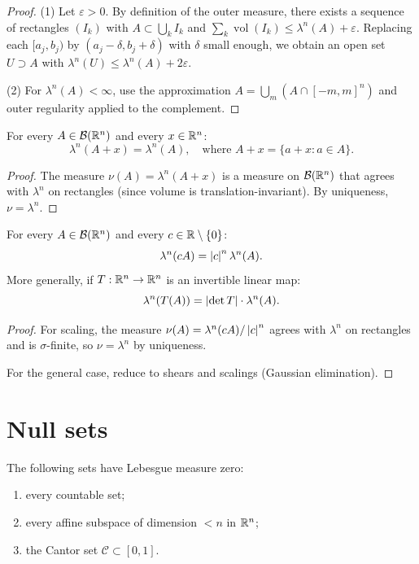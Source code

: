 \begin{proof}
(1) Let $\varepsilon > 0$. By definition of the outer measure, there exists a
sequence of rectangles $(I_k)$ with $A \subset \bigcup_k I_k$ and
$\sum_k \operatorname{vol}(I_k) \leq \lambda^n(A) + \varepsilon$. Replacing each
$[a_j, b_j)$ by $(a_j - \delta, b_j + \delta)$ with $\delta$ small enough, we
obtain an open set $U \supset A$ with $\lambda^n(U) \leq \lambda^n(A) +
2\varepsilon$.

(2) For $\lambda^n(A) < \infty$, use the approximation
$A = \bigcup_m (A \cap [-m, m]^n)$ and outer regularity applied to the complement.
\end{proof}

\begin{theorem}
\label{thm:translation_invariance}
For every $A \in \mathcal{B}(\mathbb{R}^n)$ and every $x \in \mathbb{R}^n$:
\[
\lambda^n(A + x) = \lambda^n(A), \quad \text{where } A + x = \{a + x : a \in A\}.
\]
\end{theorem}

\begin{proof}
The measure $\nu(A) = \lambda^n(A + x)$ is a measure on $\mathcal{B}(\mathbb{R}^n)$ that
agrees with $\lambda^n$ on rectangles (since volume is translation-invariant). By
uniqueness, $\nu = \lambda^n$.
\end{proof}

\begin{theorem}
For every $A \in \mathcal{B}(\mathbb{R}^n)$ and every $c \in \mathbb{R} \setminus \{0\}$:
\[
\lambda^n(cA) = \left| c \right|^n \lambda^n(A).
\]
More generally, if $T : \mathbb{R}^n \to \mathbb{R}^n$ is an invertible linear map:
\[
\lambda^n(T(A)) = \left| \det T \right| \cdot \lambda^n(A).
\]
\end{theorem}

\begin{proof}
For scaling, the measure $\nu(A) = \lambda^n(cA)/\left| c \right|^n$ agrees with $\lambda^n$
on rectangles and is $\sigma$-finite, so $\nu = \lambda^n$ by uniqueness.

For the general case, reduce to shears and scalings (Gaussian elimination).
\end{proof}

\section{Null sets}

\begin{proposition}
The following sets have Lebesgue measure zero:
\begin{enumerate}
    \item every countable set;
    \item every affine subspace of dimension $< n$ in $\mathbb{R}^n$;
    \item the Cantor set $\mathcal{C} \subset [0,1]$.
\end{enumerate}
\end{proposition}


